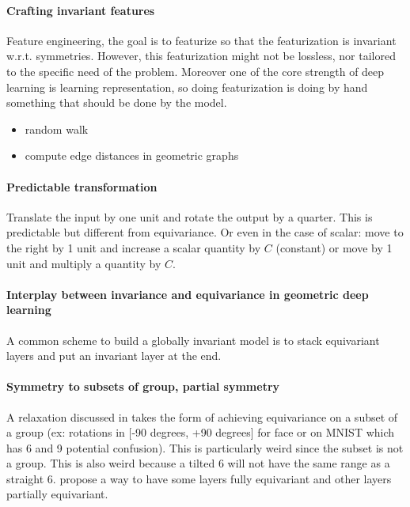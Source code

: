 \myline

\paragraph{Crafting invariant features}
Feature engineering, the goal is to featurize so that the featurization is invariant w.r.t. symmetries. However, this featurization might not be lossless, nor tailored to the specific need of the problem. Moreover one of the core strength of deep learning is learning representation, so doing featurization is doing by hand something that should be done by the model. 
\begin{itemize}
    \item random walk
    \item compute edge distances in geometric graphs
\end{itemize}

\myline

\paragraph{Predictable transformation}
Translate the input by one unit and rotate the output by a quarter. This is predictable but different from equivariance.
Or even in the case of scalar: move to the right by 1 unit and increase a scalar quantity by $C$ (constant) or move by 1 unit and multiply a quantity by $C$.

\myline

\paragraph{Interplay between invariance and equivariance in geometric deep learning}
A common scheme to build a globally invariant model is to stack equivariant layers and put an invariant layer at the end.

\myline

\paragraph{Symmetry to subsets of group, partial symmetry}
A relaxation discussed in \cite{romero2023} takes the form of achieving equivariance on a subset of a group (ex: rotations in [-90 degrees, +90 degrees] for face or on MNIST which has 6 and 9 potential confusion). This is particularly weird since the subset is not a group. This is also weird because a tilted 6 will not have the same range as a straight 6. \cite{romero2023} propose a way to have some layers fully equivariant and other layers partially equivariant.

